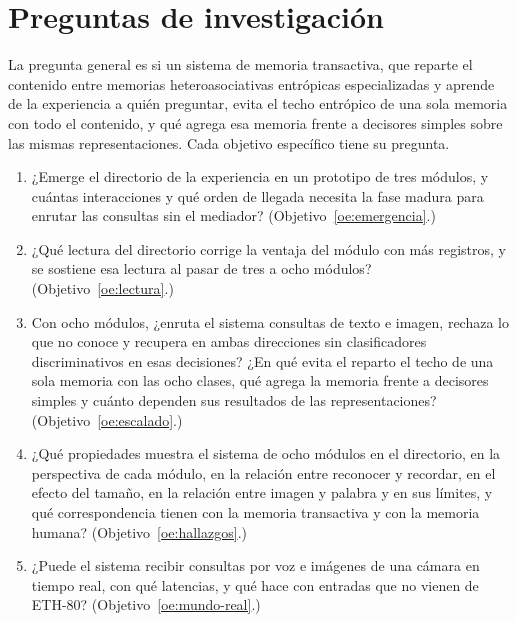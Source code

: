 \section{Preguntas de investigación}\label{fase:preguntas}

La pregunta general es si un sistema de memoria transactiva, que reparte el contenido
entre memorias heteroasociativas entrópicas especializadas y aprende de la experiencia a quién
preguntar, evita el techo entrópico de una sola memoria con todo el contenido, y qué
agrega esa memoria frente a decisores simples sobre las mismas representaciones.
Cada objetivo específico tiene su pregunta.

\begin{enumerate}
    \item \label{fase:pi-emergencia}
    ¿Emerge el directorio de la experiencia en un prototipo de tres módulos, y cuántas
    interacciones y qué orden de llegada necesita la fase madura para enrutar las
    consultas sin el mediador? (Objetivo~\ref{oe:emergencia}.)
    \item \label{fase:pi-lectura}
    ¿Qué lectura del directorio corrige la ventaja del módulo con más registros, y se
    sostiene esa lectura al pasar de tres a ocho módulos?
    (Objetivo~\ref{oe:lectura}.)
    \item \label{fase:pi-escalado}
    Con ocho módulos, ¿enruta el sistema consultas de texto e imagen, rechaza lo que no
    conoce y recupera en ambas direcciones sin clasificadores discriminativos en esas
    decisiones? ¿En qué evita el reparto el techo de una sola memoria con las ocho clases,
    qué agrega la memoria frente a decisores simples y cuánto dependen sus resultados de
    las representaciones? (Objetivo~\ref{oe:escalado}.)
    \item \label{fase:pi-hallazgos}
    ¿Qué propiedades muestra el sistema de ocho módulos en el directorio, en la
    perspectiva de cada módulo, en la relación entre reconocer y recordar, en el efecto
    del tamaño, en la relación entre imagen y palabra y en sus límites, y qué
    correspondencia tienen con la memoria transactiva y con la memoria humana?
    (Objetivo~\ref{oe:hallazgos}.)
    \item \label{fase:pi-mundo-real}
    ¿Puede el sistema recibir consultas por voz e imágenes de una cámara en tiempo real,
    con qué latencias, y qué hace con entradas que no vienen de ETH-80?
    (Objetivo~\ref{oe:mundo-real}.)
\end{enumerate}
